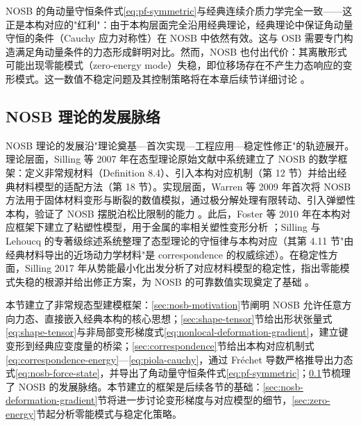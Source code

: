 \begin{remark}
  NOSB 的角动量守恒条件式\eqref{eq:pf-symmetric}与经典连续介质力学完全一致——这正是本构对应的"红利"：由于本构层面完全沿用经典理论，经典理论中保证角动量守恒的条件（Cauchy 应力对称性）在 NOSB 中依然有效。这与 OSB 需要专门构造满足角动量条件的力态形成鲜明对比。然而，NOSB 也付出代价：其离散形式可能出现零能模式（zero-energy mode）失稳，即位移场存在不产生力态响应的变形模式。这一数值不稳定问题及其控制策略将在本章后续节详细讨论 \cite{Silling2017}。
\end{remark}

\subsection{NOSB 理论的发展脉络}\label{sec:nosb-history}

NOSB 理论的发展沿"理论奠基—首次实现—工程应用—稳定性修正"的轨迹展开。理论层面，Silling 等 2007 年在态型理论原始文献中系统建立了 NOSB 的数学框架：定义非常规材料（Definition 8.4）、引入本构对应机制（第 12 节）并给出经典材料模型的适配方法（第 18 节）\cite{Silling2007}。实现层面，Warren 等 2009 年首次将 NOSB 方法用于固体材料变形与断裂的数值模拟，通过极分解处理有限转动、引入弹塑性本构，验证了 NOSB 摆脱泊松比限制的能力 \cite{Warren2009}。此后，Foster 等 2010 年在本构对应框架下建立了粘塑性模型，用于金属的率相关塑性变形分析 \cite{Foster2010}；Silling 与 Lehoucq 的专著级综述系统整理了态型理论的守恒律与本构对应（其第 4.11 节"由经典材料导出的近场动力学材料"是 correspondence 的权威综述）\cite{SillingLehoucq2010}。在稳定性方面，Silling 2017 年从势能最小化出发分析了对应材料模型的稳定性，指出零能模式失稳的根源并给出修正方案，为 NOSB 的可靠数值实现奠定了基础 \cite{Silling2017}。

本节建立了非常规态型建模框架：\ref{sec:nosb-motivation}节阐明 NOSB 允许任意方向力态、直接嵌入经典本构的核心思想；\ref{sec:shape-tensor}节给出形状张量式\eqref{eq:shape-tensor}与非局部变形梯度式\eqref{eq:nonlocal-deformation-gradient}，建立键变形到经典应变度量的桥梁；\ref{sec:correspondence}节给出本构对应机制式\eqref{eq:correspondence-energy}—\eqref{eq:piola-cauchy}，通过 Fréchet 导数严格推导出力态式\eqref{eq:nosb-force-state}，并导出了角动量守恒条件式\eqref{eq:pf-symmetric}；\ref{sec:nosb-history}节梳理了 NOSB 的发展脉络。本节建立的框架是后续各节的基础：\ref{sec:nosb-deformation-gradient}节将进一步讨论变形梯度与对应模型的细节，\ref{sec:zero-energy}节起分析零能模式与稳定化策略。


